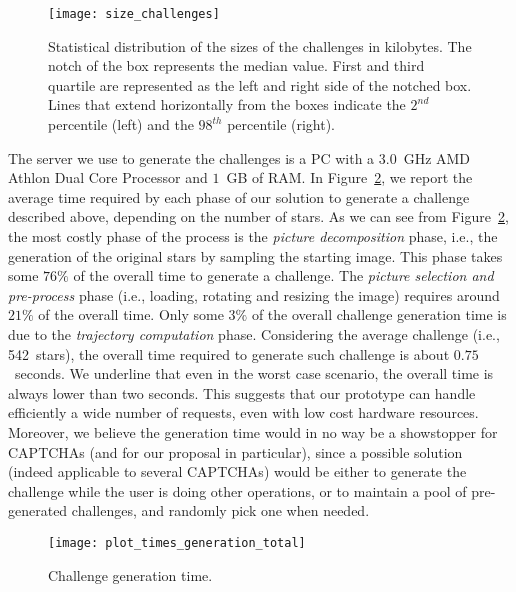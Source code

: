 \documentclass[conference]{IEEEtran}
\newcommand{\hilight}[1]{#1}
\begin{document}
\begin{figure}[ht]\centering
\texttt{[image: size\_challenges]}
\caption{Statistical distribution of the sizes of the challenges in kilobytes. The
notch of the box represents the median value. First and third quartile
are represented as the left and right side of the notched box.  
Lines that extend horizontally from the boxes indicate the $2^{nd}$ percentile (left) and
the $98^{th}$ percentile (right).}
\label{fig:sizeChallenge}
\end{figure}


The server we use to generate the challenges is a PC with a $3.0$~GHz AMD Athlon Dual Core Processor and $1$~GB of RAM.
In Figure~\ref{fig:timesGeneration},
\hilight{we report the average time required by each phase of our solution to generate a challenge described above, depending on the number of stars.
As we can see from Figure~\ref{fig:timesGeneration}, the most costly phase of the process is the \textit{picture decomposition} phase, i.e., the generation of the original stars by sampling the starting image.
This phase takes some $76\%$ of the overall time to generate a challenge.
The \textit{picture selection and pre-process} phase (i.e., loading, rotating and resizing the image) requires around $21\%$ of the overall time.
Only some $3\%$ of the overall challenge generation time is due to the \textit{trajectory computation} phase.
Considering the average challenge (i.e., 542~stars), the overall time required to generate such challenge is about $0.75$~seconds.
We underline that even in the worst case scenario, the overall time is always lower than two seconds.}
This suggests that our prototype can handle efficiently a wide number of requests, even with low cost hardware resources.
\hilight{Moreover, we believe the generation time would in no way be a showstopper for CAPTCHAs (and for our proposal in particular), since a possible solution (indeed applicable to several CAPTCHAs) would be either to generate the challenge while the user is doing other operations, or to maintain a pool of pre-generated challenges, and randomly pick one when needed.}


\begin{figure}[ht]\centering
\texttt{[image: plot\_times\_generation\_total]}
\caption{Challenge generation time.}
\label{fig:timesGeneration}
\end{figure}
\end{document}
